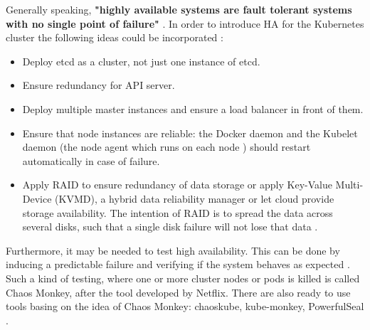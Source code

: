 Generally speaking, \textbf{"highly available systems are fault tolerant systems with no single point of failure"} \cite{article-redundancy-models}. In order to introduce HA for the Kubernetes cluster the following ideas could be incorporated \cite{book-mastering-k8s}:
\begin{itemize}
\item Deploy etcd as a cluster, not just one instance of etcd.
\item Ensure redundancy for API server.
\item Deploy multiple master instances and ensure a load balancer in front of them.
\item Ensure that node instances are reliable: the Docker daemon and the Kubelet daemon (the node agent which runs on each node \cite{k8s-kubelet}) should restart automatically in case of failure.
\item Apply RAID to ensure redundancy of data storage or apply Key-Value Multi-Device (KVMD), a hybrid data reliability manager\cite{data-rel-kv} or let cloud provide storage availability. The intention of RAID is to spread the data across several disks, such that a single disk failure will not lose that data \cite{raid}.
\end{itemize}

Furthermore, it may be needed to test high availability. This can be done by inducing a predictable failure and verifying if the system behaves as expected \cite{book-mastering-k8s}. Such a kind of testing, where one or more cluster nodes or pods is killed is called Chaos Monkey, after the tool developed by Netflix. There are also ready to use tools basing on the idea of Chaos Monkey: chaoskube, kube-monkey, PowerfulSeal \cite{book-cndwk}.

